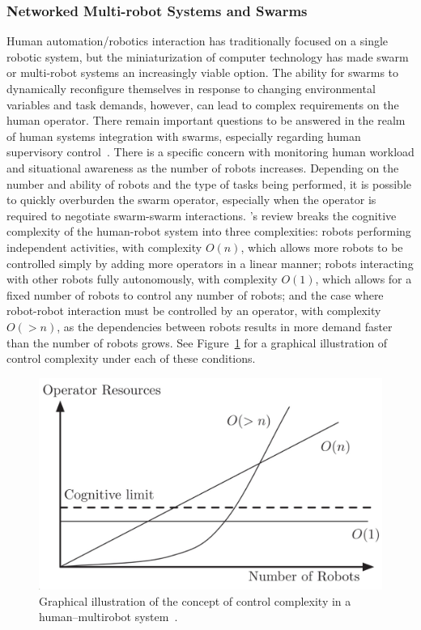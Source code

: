 \subsubsection{Networked Multi-robot Systems and Swarms}
Human automation/robotics interaction has traditionally focused on a single robotic system, but the miniaturization of computer technology has made swarm or multi-robot systems an increasingly viable option.
The ability for swarms to dynamically reconfigure themselves in response to changing environmental variables and task demands, however, can lead to complex requirements on the human operator.
There remain important questions to be answered in the realm of human systems integration with swarms, especially regarding human supervisory control~\citep{kolling_human_2016}.
There is a specific concern with monitoring human workload and situational awareness as the number of robots increases.
Depending on the number and ability of robots and the type of tasks being performed, it is possible to quickly overburden the swarm operator, especially when the operator is required to negotiate swarm-swarm interactions.
\citeauthor{kolling_human_2016}'s \citeyear{kolling_human_2016} review breaks the cognitive complexity of the human-robot system into three complexities: robots performing independent activities, with complexity $O(n)$, which allows more robots to be controlled simply by adding more operators in a linear manner; robots interacting with other robots fully autonomously, with complexity $O(1)$, which allows for a fixed number of robots to control any number of robots; and the case where robot-robot interaction must be controlled by an operator, with complexity $O(>n)$, as the dependencies between robots results in more demand faster than the number of robots grows.
See Figure~\ref{figure-hari:controlcomplexity} for a graphical illustration of control complexity under each of these conditions.

\begin{figure}[b!]
    \begin{center}
        \includegraphics[width=0.8\linewidth]{figures/TradeStudy/figure2.png}
        \caption[Control complexity in a human–multirobot system]{Graphical illustration of the concept of control complexity in a human–multirobot system~\citep{kolling_human_2016}.}
        \label{figure-hari:controlcomplexity}
    \end{center}
\end{figure}

